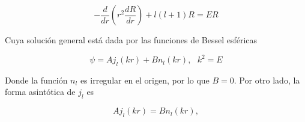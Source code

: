 \begin{equation}
-\frac{d}{dr} \left(r^2 \frac{d R}{dr} \right) +  l (l + 1) R = E R
\end{equation}

Cuya solución general está dada por las funciones de Bessel esféricas

\begin{equation*}
\psi=A j_l(k r) + B n_l(kr), ~~~ k^2=E
\end{equation*}

Donde la función $n_l$ es irregular en el origen, por lo que $B=0$. Por otro lado, la forma asintótica de $j_l$ es

\begin{equation*}
A j_l(k r) =  B n_l(kr),
\end{equation*}


